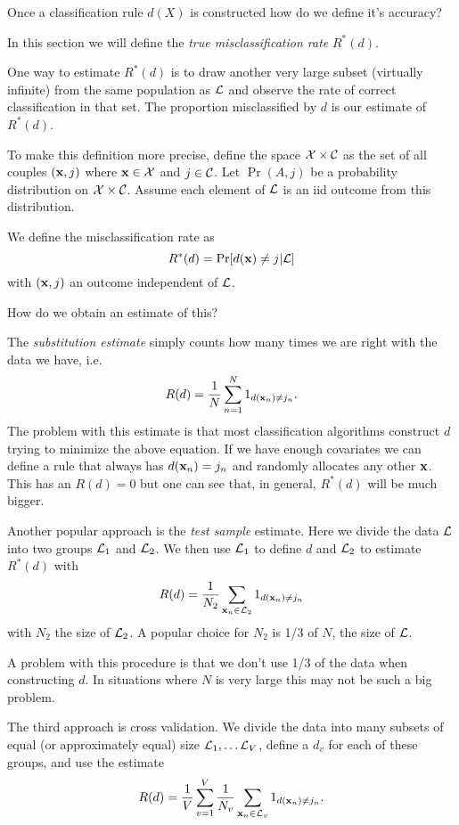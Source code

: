 Once a classification rule $d(X)$ is constructed how do we define it's
accuracy? 

In this section we will define the {\it true misclassification rate}
$R^*(d)$.


One way to estimate $R^*(d)$ is to draw another very large subset
(virtually infinite) from the same population as $\cal L$ and observe
the rate of correct classification in that set. The proportion
misclassified by $d$ is our estimate of $R^*(d)$. 

To make this definition more precise, define the space ${\cal X} \times
{\cal C}$ as the set of all couples 
$({\mathbf x},j)$ where ${\mathbf x} \in {\cal X}$ and $j \in {\cal C}$. Let
$\Pr(A,j)$ be a probability distribution on  ${\cal X} \times {\cal
  C}$. Assume each element of $\cal L$ is an iid outcome
from this distribution. 

We define the misclassification rate as 
\begin{equation}
\label{mr}
R^*(d) = \Pr[d({\mathbf x}) \neq j | {\cal L}]
\end{equation}
with $({\mathbf x},j)$ an outcome independent of $\cal L$.

How do we obtain an estimate of this?

The {\it substitution estimate} simply counts how many times we are
right with the data we have, i.e.
\[
R(d) = \frac{1}{N} \sum_{n=1}^N 1_{d({\mathbf x}_n) \neq j_n}.
\]
The problem with this estimate is that most classification algorithms
construct $d$ trying to minimize the above equation. If we have enough
covariates we can define a rule that always has $d({\mathbf x}_n) = j_n$ and
randomly allocates any other ${\mathbf x}$. This has an $R(d)=0$ but one can
see that, in general, $R^*(d)$ will be much bigger.

Another popular approach is the {\it test sample} estimate. Here we
divide the data $\cal L$ into two groups ${\cal L}_1$ and
${\cal L}_2$. We then use ${\cal L}_1$ to define $d$ and ${\cal L}_2$
to estimate $R^*(d)$ with
\[
R(d) =\frac{1}{N_2} \sum_{{\mathbf x}_n \in {\cal L}_2} 1_{d({\mathbf x}_n) \neq j_n}
\]
with $N_2$ the size of ${\cal L}_2$. A popular choice for $N_2$ is
1/3 of $N$, the size of $\cal L$.

A problem with this procedure is that we don't use 1/3 of the data
when constructing $d$. In situations where $N$ is very large this may
not be such a big problem.

The third approach is cross validation. We divide the data into many
subsets of equal (or approximately equal) size ${\cal L}_1,\dots{\cal
  L}_V$, define a $d_v$ for each of these groups, and use the estimate
\[
R(d) = \frac{1}{V}\sum_{v=1}^V \frac{1}{N_v} \sum_{{\mathbf x}_n \in {\cal L}_v} 
 1_{d({\mathbf x}_n) \neq j_n}.
\]

